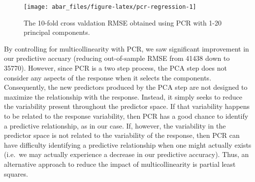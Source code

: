 \documentclass[]{book}
\newenvironment{Shaded}{\begin{snugshade}}{\end{snugshade}}
\newcommand{\CommentTok}[1]{\textcolor[rgb]{0.56,0.35,0.01}{\textit{#1}}}
\newcommand{\DataTypeTok}[1]{\textcolor[rgb]{0.13,0.29,0.53}{#1}}
\newcommand{\DecValTok}[1]{\textcolor[rgb]{0.00,0.00,0.81}{#1}}
\newcommand{\KeywordTok}[1]{\textcolor[rgb]{0.13,0.29,0.53}{\textbf{#1}}}
\newcommand{\NormalTok}[1]{#1}
\newcommand{\OperatorTok}[1]{\textcolor[rgb]{0.81,0.36,0.00}{\textbf{#1}}}
\newcommand{\StringTok}[1]{\textcolor[rgb]{0.31,0.60,0.02}{#1}}
\theoremstyle{definition}
\theoremstyle{definition}
\theoremstyle{definition}
\theoremstyle{remark}
\begin{document}
\begin{Shaded}
\end{Shaded}

\begin{figure}

{\centering \texttt{[image: abar\_files/figure-latex/pcr-regression-1]} 

}

\caption{The 10-fold cross valdation RMSE obtained using PCR with 1-20 principal components.}\label{fig:pcr-regression}
\end{figure}

By controlling for multicollinearity with PCR, we saw significant
improvement in our predictive accuary (reducing out-of-sample RMSE from
41438 down to 35770). However, since PCR is a two step process, the PCA
step does not consider any aspects of the response when it selects the
components. Consequently, the new predictors produced by the PCA step
are not designed to maximize the relationship with the response.
Instead, it simply seeks to reduce the variability present throughout
the predictor space. If that variability happens to be related to the
response variability, then PCR has a good chance to identify a
predictive relationship, as in our case. If, however, the variability in
the predictor space is not related to the variability of the response,
then PCR can have difficulty identifying a predictive relationship when
one might actually exists (i.e.~we may actually experience a decrease in
our predictive accuracy). Thus, an alternative approach to reduce the
impact of multicollinearity is partial least squares.
\end{document}
